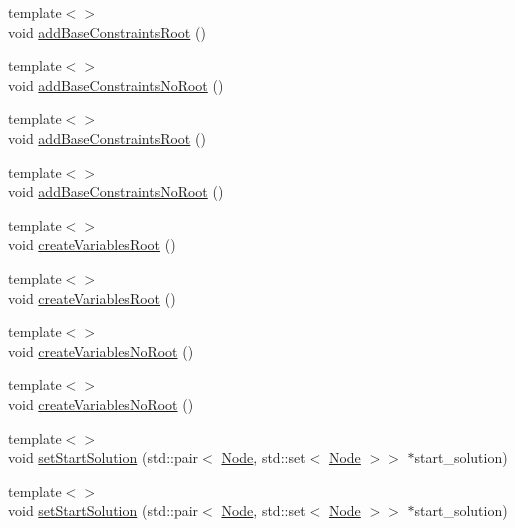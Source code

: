 \begin{DoxyCompactItemize}
\item 
{\footnotesize template$<$$>$ }\\void \hyperlink{classderegnet_1_1DeregnetModel_a377a4df1d8935fdb5628775df077a029}{add\+Base\+Constraints\+Root} ()
\item 
{\footnotesize template$<$$>$ }\\void \hyperlink{classderegnet_1_1DeregnetModel_ad46d039147e10e7afb08a9ede2fc8a69}{add\+Base\+Constraints\+No\+Root} ()
\item 
{\footnotesize template$<$$>$ }\\void \hyperlink{classderegnet_1_1DeregnetModel_a075dee6e8c4cb899b485dc3627e78791}{add\+Base\+Constraints\+Root} ()
\item 
{\footnotesize template$<$$>$ }\\void \hyperlink{classderegnet_1_1DeregnetModel_a54f3e682bcd27dab4046ac879f69ff91}{add\+Base\+Constraints\+No\+Root} ()
\item 
{\footnotesize template$<$$>$ }\\void \hyperlink{classderegnet_1_1DeregnetModel_aef6cc7f88d0590243d12b9c473ca3ee9}{create\+Variables\+Root} ()
\item 
{\footnotesize template$<$$>$ }\\void \hyperlink{classderegnet_1_1DeregnetModel_a338d7fe9e37a2dc4e4341b10bdce991f}{create\+Variables\+Root} ()
\item 
{\footnotesize template$<$$>$ }\\void \hyperlink{classderegnet_1_1DeregnetModel_aefb0e4b6a3fc7ff0dd6beffc9d826f1d}{create\+Variables\+No\+Root} ()
\item 
{\footnotesize template$<$$>$ }\\void \hyperlink{classderegnet_1_1DeregnetModel_ab0653fa747e69cd61b0721440dc57552}{create\+Variables\+No\+Root} ()
\item 
{\footnotesize template$<$$>$ }\\void \hyperlink{classderegnet_1_1DeregnetModel_afc649e6b52c4e993b17bad158799fdb3}{set\+Start\+Solution} (std\+::pair$<$ \hyperlink{namespacederegnet_a744bad34f2de9856d36715a445f027f3}{Node}, std\+::set$<$ \hyperlink{namespacederegnet_a744bad34f2de9856d36715a445f027f3}{Node} $>$$>$ $\ast$start\+\_\+solution)
\item 
{\footnotesize template$<$$>$ }\\void \hyperlink{classderegnet_1_1DeregnetModel_acb0700e2cc2af475bc99255027e4757a}{set\+Start\+Solution} (std\+::pair$<$ \hyperlink{namespacederegnet_a744bad34f2de9856d36715a445f027f3}{Node}, std\+::set$<$ \hyperlink{namespacederegnet_a744bad34f2de9856d36715a445f027f3}{Node} $>$$>$ $\ast$start\+\_\+solution)

\end{DoxyCompactItemize}
